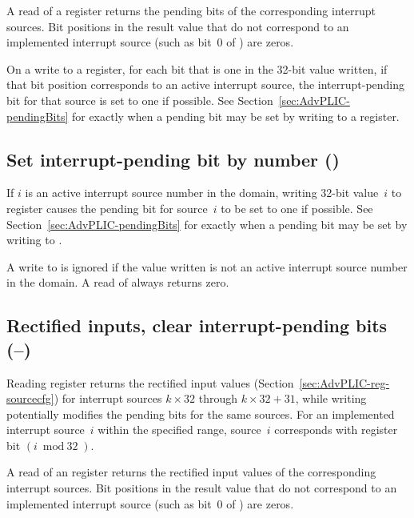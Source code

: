 A read of a  register returns the pending bits of the
corresponding interrupt sources.
Bit positions in the result value that do not correspond to an
implemented interrupt source (such as bit~0 of ) are
zeros.

On a write to a  register, for each bit that is one in the
\mbox{32-bit} value written, if that bit position corresponds to an
active interrupt source, the interrupt-pending bit for that source is
set to one if possible.
See Section~\ref{sec:AdvPLIC-pendingBits} for exactly when a pending
bit may be set by writing to a  register.

\subsection{Set interrupt-pending bit by number ()}

If $i$ is an active interrupt source number in the domain, writing
\mbox{32-bit} value~$i$ to register  causes the pending bit
for source~$i$ to be set to one if possible.
See Section~\ref{sec:AdvPLIC-pendingBits} for exactly when a pending
bit may be set by writing to .

A write to  is ignored if the value written is not an
active interrupt source number in the domain.
A read of  always returns zero.

\subsection{%
Rectified inputs, clear interrupt-pending bits
 (--)%
}

Reading register  returns the rectified input
values (Section~\ref{sec:AdvPLIC-reg-sourcecfg}) for interrupt sources
$k\times\mbox{32}$ through ${k\times\mbox{32}+\mbox{31}}$, while
writing  potentially modifies the pending bits for
the same sources.
For an implemented interrupt source~$i$ within the specified range,
source~$i$ corresponds with register bit ${(i\bmod\mbox{32})}$.

A read of an  register returns the rectified input values
of the corresponding interrupt sources.
Bit positions in the result value that do not correspond to an
implemented interrupt source (such as bit~0 of )
are zeros.

